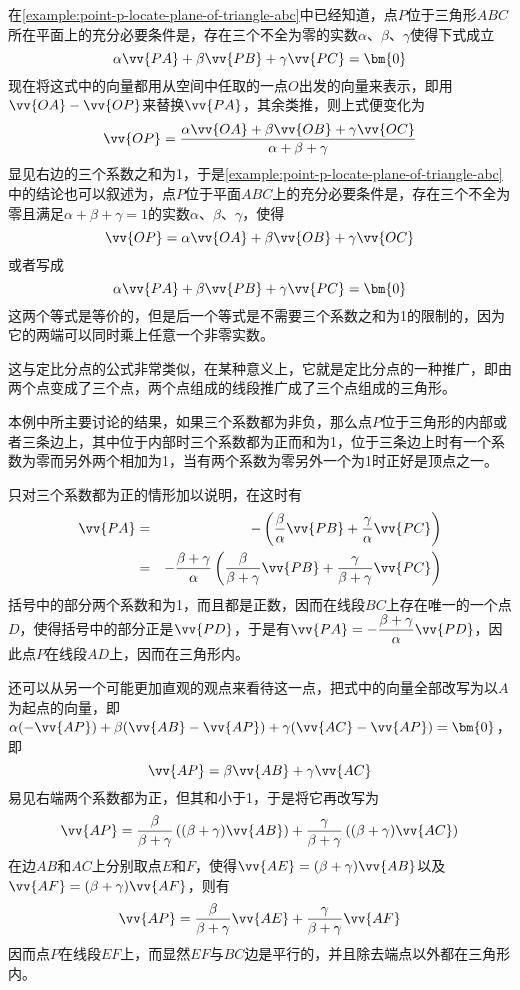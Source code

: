 \begin{example}
  \label{example:point-P-and-triangle-ABC}
  在\autoref{example:point-p-locate-plane-of-triangle-abc}中已经知道，点$P$位于三角形$ABC$所在平面上的充分必要条件是，存在三个不全为零的实数$\alpha$、$\beta$、$\gamma$使得下式成立
  \[ \alpha \vv{PA} + \beta \vv{PB} + \gamma \vv{PC} = \bm{0} \]
  现在将这式中的向量都用从空间中任取的一点$O$出发的向量来表示，即用$\vv{OA}-\vv{OP}$来替换$\vv{PA}$，其余类推，则上式便变化为
  \[ \vv{OP} = \frac{\alpha \vv{OA} + \beta \vv{OB} + \gamma \vv{OC}}{\alpha+\beta+\gamma} \]
  显见右边的三个系数之和为1，于是\autoref{example:point-p-locate-plane-of-triangle-abc}中的结论也可以叙述为，点$P$位于平面$ABC$上的充分必要条件是，存在三个不全为零且满足$\alpha+\beta+\gamma=1$的实数$\alpha$、$\beta$、$\gamma$，使得
  \[ \vv{OP} = \alpha \vv{OA} + \beta \vv{OB} + \gamma \vv{OC} \]
  或者写成
  \[ \alpha \vv{PA} + \beta \vv{PB} + \gamma \vv{PC} = \bm{0} \]
  这两个等式是等价的，但是后一个等式是不需要三个系数之和为1的限制的，因为它的两端可以同时乘上任意一个非零实数。
  
  这与定比分点的公式非常类似，在某种意义上，它就是定比分点的一种推广，即由两个点变成了三个点，两个点组成的线段推广成了三个点组成的三角形。
 
本例中所主要讨论的结果，如果三个系数都为非负，那么点$P$位于三角形的内部或者三条边上，其中位于内部时三个系数都为正而和为1，位于三条边上时有一个系数为零而另外两个相加为1，当有两个系数为零另外一个为1时正好是顶点之一。

  只对三个系数都为正的情形加以说明，在这时有
  \begin{eqnarray*}
    \vv{PA} & = & - \left( \frac{\beta}{\alpha}\vv{PB} + \frac{\gamma}{\alpha} \vv{PC} \right) \\
    & = & -\frac{\beta+\gamma}{\alpha} \left( \frac{\beta}{\beta+\gamma} \vv{PB} + \frac{\gamma}{\beta+\gamma} \vv{PC} \right)
  \end{eqnarray*}
  括号中的部分两个系数和为1，而且都是正数，因而在线段$BC$上存在唯一的一个点$D$，使得括号中的部分正是$\vv{PD}$，于是有$\vv{PA}=-\dfrac{\beta+\gamma}{\alpha} \vv{PD}$，因此点$P$在线段$AD$上，因而在三角形内。

  还可以从另一个可能更加直观的观点来看待这一点，把式中的向量全部改写为以$A$为起点的向量，即$\alpha (-\vv{AP})+\beta (\vv{AB}-\vv{AP})+\gamma (\vv{AC}-\vv{AP})=\bm{0}$，即
  \[ \vv{AP} = \beta \vv{AB} + \gamma \vv{AC} \]
  易见右端两个系数都为正，但其和小于1，于是将它再改写为
  \[ \vv{AP} = \frac{\beta}{\beta+\gamma} \left( (\beta+\gamma)\vv{AB} \right) + \frac{\gamma}{\beta+\gamma} \left( (\beta+\gamma) \vv{AC} \right) \]
  在边$AB$和$AC$上分别取点$E$和$F$，使得$\vv{AE} = (\beta+\gamma)\vv{AB}$以及$\vv{AF}=(\beta+\gamma)\vv{AF}$，则有
  \[ \vv{AP}=\frac{\beta}{\beta+\gamma} \vv{AE} + \frac{\gamma}{\beta+\gamma} \vv{AF} \]
  因而点$P$在线段$EF$上，而显然$EF$与$BC$边是平行的，并且除去端点以外都在三角形内。


\end{example}
